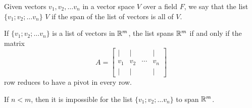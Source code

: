 





Given vectors $v_1, v_2, \ldots v_n$ in a vector space $V$ over a field $F$, we say that the list $\{v_1; v_2; \ldots v_n\}$ {} $V$ if 
the span of the list of vectors is all of $V$.



\endedxtext



If $\{v_1; v_2; \ldots v_n\}$ is a list of vectors in $\mathbb R^m$, the list spans $\mathbb R^m$ if and only if 
the matrix 
\[ A = \left[ \begin{array}{cccc} | & | & & | \\ 
v_1 & v_2 & \cdots & v_n \\
 | & | & & | \end{array} \right] \]
 row reduces to have a pivot in every row.  
 

If $n<m$, then it is impossible for the list $\{v_1; v_2; \ldots v_n\}$ to span $\mathbb R^m$.    


\endedxtext





